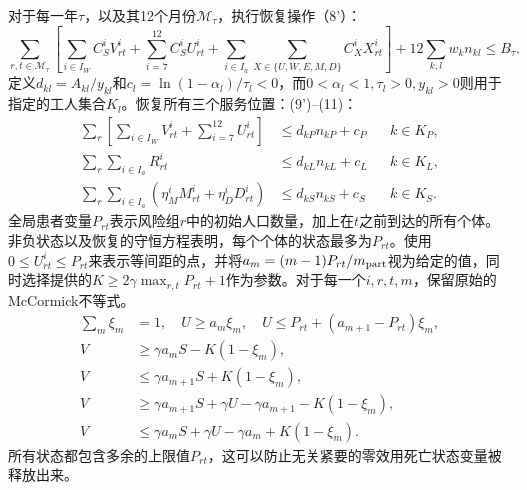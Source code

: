 \documentclass{article}
\begin{document}
对于每一年$\tau$，以及其12个月份$\mathcal M_\tau$，执行恢复操作（8'）：
\[
\sum_{r,t\in\mathcal M_\tau}
\left[\sum_{i\in I_W}C_S^iV^i_{rt}
+\sum_{i=7}^{12}C_S^iU^i_{rt}
+\sum_{i\in I_a}\sum_{X\in\{U,W,E,M,D\}}C_X^iX^i_{rt}\right]
+12\sum_{k,l}w_kn_{kl}\le B_\tau .
\]
定义$d_{kl}=A_{kl}/y_{kl}$和$c_l=\ln(1-\alpha_l)/\tau_l<0$，而$0<\alpha_l<1,\tau_l>0,y_{kl}>0$则用于指定的工人集合$K_l$。恢复所有三个服务位置：(9')–(11)：
\begin{align*}
\sum_r\left[\sum_{i\in I_W}V^i_{rt}
+\sum_{i=7}^{12}U^i_{rt}\right]&\le d_{kP}n_{kP}+c_P&&k\in K_P,\\
\sum_r\sum_{i\in I_a}R^i_{rt}&\le d_{kL}n_{kL}+c_L&&k\in K_L,\\
\sum_r\sum_{i\in I_a}(\eta_M^iM^i_{rt}+\eta_D^iD^i_{rt})
 &\le d_{kS}n_{kS}+c_S&&k\in K_S.
\end{align*}
全局患者变量$P_{rt}$表示风险组$r$中的初始人口数量，加上在$t$之前到达的所有个体。非负状态以及恢复的守恒方程表明，每个个体的状态最多为$P_{rt}$。使用$0\le U^i_{rt}\le P_{rt}$来表示等间距的点，并将$a_m=(m-1)P_{rt}/m_{\rm part}$视为给定的值，同时选择提供的$K\ge2\gamma\max_{r,t}P_{rt}+1$作为参数。对于每一个$i,r,t,m$，保留原始的McCormick不等式。
\begin{align*}
\sum_m\xi_m&=1,\quad U\ge a_m\xi_m,\quad
U\le P_{rt}+(a_{m+1}-P_{rt})\xi_m,\\
V&\ge\gamma a_mS-K(1-\xi_m),\\
V&\le\gamma a_{m+1}S+K(1-\xi_m),\\
V&\ge\gamma a_{m+1}S+\gamma U-\gamma a_{m+1}-K(1-\xi_m),\\
V&\le\gamma a_mS+\gamma U-\gamma a_m+K(1-\xi_m).
\end{align*}
所有状态都包含多余的上限值$P_{rt}$，这可以防止无关紧要的零效用死亡状态变量被释放出来。
\end{document}
